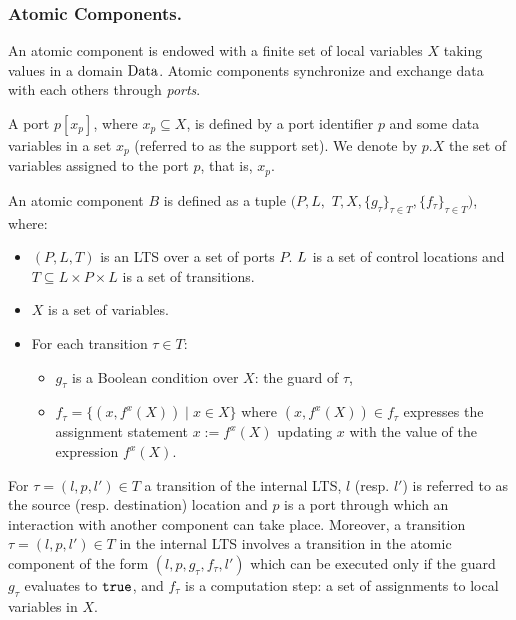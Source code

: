 \subsubsection{Atomic Components.}
%
An atomic component is endowed with a finite set of local variables $X$ taking values in a domain $\mathit{\Data}$. Atomic components synchronize and exchange data with each others through \emph{ports}.
%
\begin{definition}[Port]
A port $p[x_p]$, where $x_p\subseteq X$, is defined by a port identifier $p$ and some data variables in a set $x_p$ (referred to as the support set). We denote by $p.X$ the set of variables assigned to the port $p$, that is, $x_p$.
\end{definition}
%
%
\begin{definition}
An atomic component $B$ is defined as a tuple $(P,L,$ $T,X,\{g_\tau\}_{\tau \in T}, \{f_{ \tau}\}_{\tau \in T})$, 
where:
\begin{itemize}
\item $(P,L,T)$ is an LTS over a set of ports $P$. $L\ignore{=\{l_1,l_2,\ldots,l_k\}}$ is a set of control locations and $T \subseteq L \times P \times L$ is a set of transitions.
\item $X$ is a set of variables.
\item For each transition $\tau \in T$: 
\begin{itemize}
\item $g_{\tau}$ is a Boolean condition over $X$: the guard of $\tau$,
\item $f_\tau = \{ (x, f^x(X)) \mid x\in X\}$ where $(x,f^x(X)) \in f_\tau$ expresses the assignment statement $x := f^x(X)$ updating $x$ with the value of the expression $f^x(X)$. 
\end{itemize}
\end{itemize}
\end{definition}
%
For $\tau = (l,p,l')\in T$ a transition of the internal LTS, $l$ (resp. $l'$) is referred to as the source (resp.
destination) location and $p$ is a port through which an interaction with another component can take place. Moreover, a transition $\tau = (l,p,l')\in T$ in the internal LTS involves a transition in the atomic component of the form $(l,p,g_\tau,f_\tau,l')$ which can be executed only if the guard $g_\tau$ evaluates to $\true$, and $f_\tau$ is a computation step: a set of assignments to local variables in $X$.

